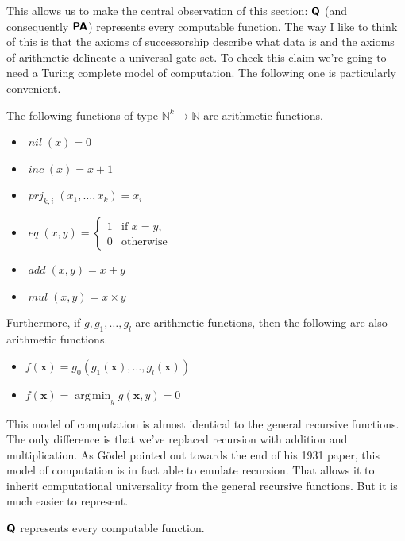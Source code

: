 \documentclass{article}
\theoremstyle{customstyle}
\DeclareMathOperator{\nil}{\mathit{nil}}
\DeclareMathOperator{\inc}{\mathit{inc}}
\DeclareMathOperator{\prj}{\mathit{prj}}
\DeclareMathOperator{\eq}{\mathit{eq}}
\DeclareMathOperator{\add}{\mathit{add}}
\DeclareMathOperator{\mul}{\mathit{mul}}
\DeclareMathOperator*{\argmin}{arg\,min}
\newcommand{\Q}{\textbf{\textsf{Q}}}
\newcommand{\PA}{\textbf{\textsf{PA}}}
\begin{document}
This allows us to make the central observation of this section: $\Q$ (and consequently $\PA$) represents every computable function. The way I like to think of this is that the axioms of successorship describe what data is and the axioms of arithmetic delineate a universal gate set. To check this claim we're going to need a Turing complete model of computation. The following one is particularly convenient.


\begin{definition}
  The following functions of type $\mathbb{N}^k \to \mathbb{N}$ are arithmetic functions.
  \begin{itemize}
    \item $\nil(x) = 0$
    \item $\inc(x) = x + 1$
    \item $\prj_{k,i}(x_1, \dots, x_k) = x_i$
    \item $\eq(x, y) = \begin{cases} 1 & \text{if } x = y,\\ 0 & \text{otherwise}\end{cases}$
    \item $\add(x, y) = x + y$
    \item $\mul(x, y) = x \times y$
  \end{itemize}
  Furthermore, if $g, g_1, \dots, g_l$ are arithmetic functions, then the following are also arithmetic functions.
  \begin{itemize}
    \item $f(\bm{x}) = g_0(g_1(\bm{x}), \dots, g_l(\bm{x}))$
    \item $f(\bm{x}) = \argmin_y g(\bm{x}, y) = 0$
  \end{itemize}
\end{definition}

This model of computation is almost identical to the general recursive functions. The only difference is that we've replaced recursion with addition and multiplication. As Gödel pointed out towards the end of his 1931 paper, this model of computation is in fact able to emulate recursion. That allows it to inherit computational universality from the general recursive functions. But it is much easier to represent.

\begin{theorem}\label{thm-qrep}
  $\Q$ represents every computable function.
\end{theorem}
\end{document}
